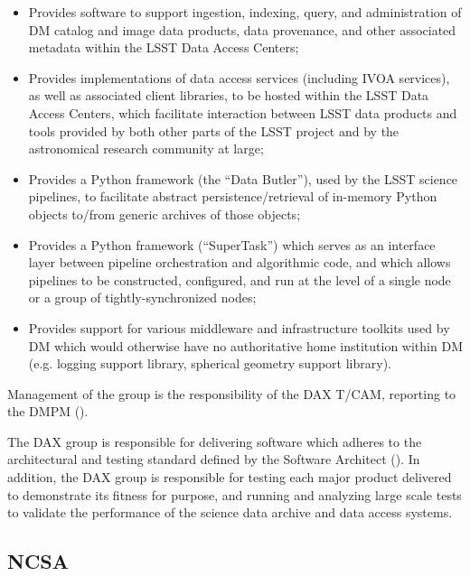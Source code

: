 \begin{itemize}

  \item{Provides software to support ingestion, indexing, query, and administration of \gls{DM} catalog and image
  data products, data \gls{provenance}, and other associated \gls{metadata} within the \gls{LSST} Data Access Centers;}

  \item{Provides implementations of data access services (including \gls{IVOA} services), as well as associated
  client libraries, to be hosted within the \gls{LSST} Data Access Centers, which facilitate interaction between
  \gls{LSST} data products and tools provided by both other parts of the \gls{LSST} project and by the astronomical
  research community at large;}

  \item{Provides a Python framework (the ``Data \gls{Butler}''), used by the \gls{LSST} science pipelines, to facilitate
  abstract persistence/retrieval of in-memory Python objects to/from generic archives of those objects;}

  \item{Provides a Python framework (``SuperTask'') which serves as an interface layer between \gls{pipeline}
  orchestration and algorithmic code, and which allows pipelines to be constructed, configured, and run at
  the level of a single node or a group of tightly-synchronized nodes;}

  \item{Provides support for various middleware and infrastructure toolkits used by \gls{DM} which would otherwise
  have no authoritative home institution within DM (e.g. logging support library, spherical geometry support
  library).}

\end{itemize}

Management of the group is the responsibility of the \gls{DAX} \gls{T/CAM}, reporting to the \gls{DMPM} ().

The \gls{DAX} group is responsible for delivering software which adheres to the architectural and testing standard
defined by the Software Architect (). In addition, the \gls{DAX} group is responsible for
testing each major product delivered to demonstrate its fitness for purpose, and running and analyzing large
scale tests to validate the performance of the science data archive and data access systems.

\subsection {NCSA\label{sect:ncsa}}

